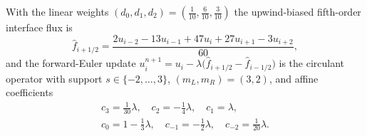 \documentclass[pdflatex,sn-mathphys-num]{sn-jnl}%
\theoremstyle{thmstyleone}%
\theoremstyle{thmstyletwo}%
\theoremstyle{thmstylethree}%
\begin{document}
\begin{appendices}
With the linear weights $(d_0,d_1,d_2)=(\tfrac1{10},\tfrac6{10},\tfrac3{10})$ the upwind-biased fifth-order interface flux is \[ \hat f_{i+1/2} =\frac{2u_{i-2}-13u_{i-1}+47u_{i}+27u_{i+1}-3u_{i+2}}{60}, \] and the forward-Euler update $u_i^{n+1}=u_i-\lambda\bigl(\hat f_{i+1/2}-\hat f_{i-1/2}\bigr)$ is the circulant operator with support $s\in\{-2,\dots,3\}$, $(m_L,m_R)=(3,2)$, and affine coefficients
\begin{gather*}
c_{3}=\tfrac{1}{30}\lambda,\quad
c_{2}=-\tfrac{1}{4}\lambda,\quad
c_{1}=\lambda,\\
c_{0}=1 - \tfrac{1}{3}\lambda,\quad
c_{-1}=-\tfrac{1}{2}\lambda,\quad
c_{-2}=\tfrac{1}{20}\lambda .
\end{gather*}

\end{appendices}


\end{document}
